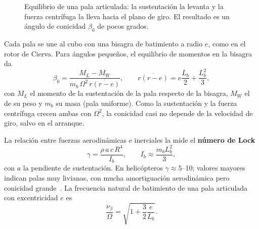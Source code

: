 \begin{figure}[H]
\centering
{}
\caption{Equilibrio de una pala articulada: la sustentación la levanta y la fuerza
centrífuga la lleva hacia el plano de giro. El resultado es un ángulo de conicidad
$\beta_0$ de pocos grados.}
\label{fig:batimiento}
\end{figure}

Cada pala se une al cubo con una bisagra de batimiento a radio $e$, como en el rotor de
Cierva. Para ángulos pequeños, el equilibrio de momentos en la bisagra da
\begin{equation}
  \beta_0 = \frac{M_L - M_W}{m_b\,\Omega^2 \,\overline{r(r-e)}},\qquad
  \overline{r(r-e)} = e\frac{L_b}{2}+\frac{L_b^2}{3},
  \label{eq:conicidad}
\end{equation}
con $M_L$ el momento de la sustentación de la pala respecto de la bisagra, $M_W$ el de su
peso y $m_b$ su masa (pala uniforme). Como la sustentación y la fuerza centrífuga crecen
ambas con $\Omega^2$, la conicidad casi no depende de la velocidad de giro, salvo en el
arranque.

La relación entre fuerzas aerodinámicas e inerciales la mide el \textbf{número de Lock}
\begin{equation}
  \gamma = \frac{\rho\, a\, c\, R^4}{I_b}, \qquad I_b \approx \frac{m_b L_b^2}{3},
  \label{eq:lock}
\end{equation}
con $a$ la pendiente de sustentación. En helicópteros $\gamma\approx5$--10; valores
mayores indican palas muy livianas, con mucha amortiguación aerodinámica pero conicidad
grande~\cite{johnson1980,leishman2006}. La frecuencia natural de batimiento de una pala
articulada con excentricidad $e$ es
\begin{equation}
  \frac{\nu_\beta}{\Omega} = \sqrt{1+\frac{3}{2}\frac{e}{L_b}} .
  \label{eq:nubeta}
\end{equation}

